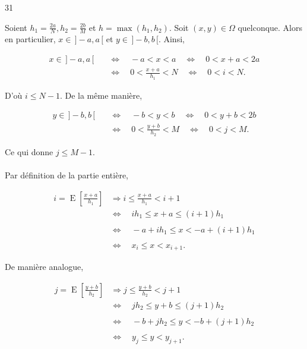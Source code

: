 \begin{reponse}{31}

Soient $h_1 = \frac{2a}{N}, h_2 = \frac{2b}{M}$ et $h=\max(h_1,h_2)$. Soit $(x,y) \in \Omega$ quelconque. Alors en particulier, $x \in \, ]-a,a \,[$ et $y \in \, ]-b,b\,[$. Ainsi,

\begin{align*}
    x \in \, ]-a,a \,[ \quad & \Longleftrightarrow \quad -a<x<a \quad \Longleftrightarrow \quad 0<x+a<2a \\
    &\Longleftrightarrow \quad 0 < \frac{x+a}{h_1} < N \quad \Longleftrightarrow \quad 0<i<N.
\end{align*}

D'où $i \leq N-1$. De la même manière,

\begin{align*}
    y \in \, ]-b,b \,[ \quad & \Longleftrightarrow \quad -b<y<b \quad \Longleftrightarrow \quad 0<y+b<2b \\
    &\Longleftrightarrow \quad 0 < \frac{y+b}{h_2} < M \quad \Longleftrightarrow \quad 0<j<M.
\end{align*}

Ce qui donne $j \leq M-1$. \\ \\
Par définition de la partie entière,

\begin{align*}
    i = \operatorname{E}\left[\frac{x+a}{h_1}\right] & \Longrightarrow i \leq \frac{x+a}{h_1} < i+1 \\
    & \Longleftrightarrow \quad ih_1 \leq x+a \leq (i+1)h_1 \\ \\
    &\Longleftrightarrow \quad -a+ih_1 \leq x < -a+(i+1)h_1 \\ \\
    & \Longleftrightarrow \quad x_i \leq x < x_{i+1}.
\end{align*}

De manière analogue,

\begin{align*}
    j = \operatorname{E}\left[\frac{y+b}{h_2}\right] & \Longrightarrow j \leq \frac{y+b}{h_2} < j+1 \\
    & \Longleftrightarrow \quad jh_2 \leq y+b \leq (j+1)h_2 \\ \\
    & \Longleftrightarrow \quad -b+jh_2 \leq y < -b+(j+1)h_2 \\ \\
    & \Longleftrightarrow \quad y_j \leq y < y_{j+1}.
\end{align*}


\end{reponse}
